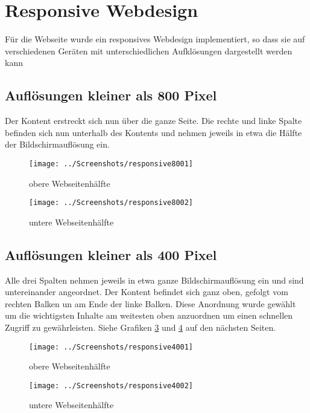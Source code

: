 
\section{Responsive Webdesign}

Für die Webseite wurde ein responsives Webdesign implementiert, so dass sie auf verschiedenen Geräten mit unterschiedlichen Aufklösungen dargestellt werden kann

\subsection{Auflösungen kleiner als 800 Pixel}
Der Kontent erstreckt sich nun über die ganze Seite. Die rechte und linke Spalte befinden sich nun unterhalb des Kontents und nehmen jeweils in etwa die Hälfte der Bildschirmauflösung ein.

\begin{figure}[!htbp]
\centering
\texttt{[image: ../Screenshots/responsive8001]}
\caption{obere Webseitenhälfte}
\label{fig:responsive8001}
\end{figure}

\begin{figure}[!htbp]
\centering
\texttt{[image: ../Screenshots/responsive8002]}
\caption{untere Webseitenhälfte}
\label{fig:responsive8002}
\end{figure}


\newpage

\subsection{Auflösungen kleiner als 400 Pixel}

Alle drei Spalten nehmen jeweils in etwa ganze Bildschirmauflösung ein und sind untereinander angeordnet. Der Kontent befindet sich ganz oben,  gefolgt vom rechten Balken un am Ende der linke Balken. Diese Anordnung wurde gewählt um die wichtigsten Inhalte am weitesten oben anzuordnen um einen schnellen Zugriff zu gewährleisten. Siehe Grafiken \ref{fig:responsive4001} und \ref{fig:responsive4002} auf den nächsten Seiten.


\begin{figure}[!htbp]
 \centering
 \texttt{[image: ../Screenshots/responsive4001]}
 \caption{obere Webseitenhälfte}
 \label{fig:responsive4001}
\end{figure}

\begin{figure}[!htbp]
 \centering
 \texttt{[image: ../Screenshots/responsive4002]}
 \caption{untere Webseitenhälfte}
 \label{fig:responsive4002}
\end{figure}
